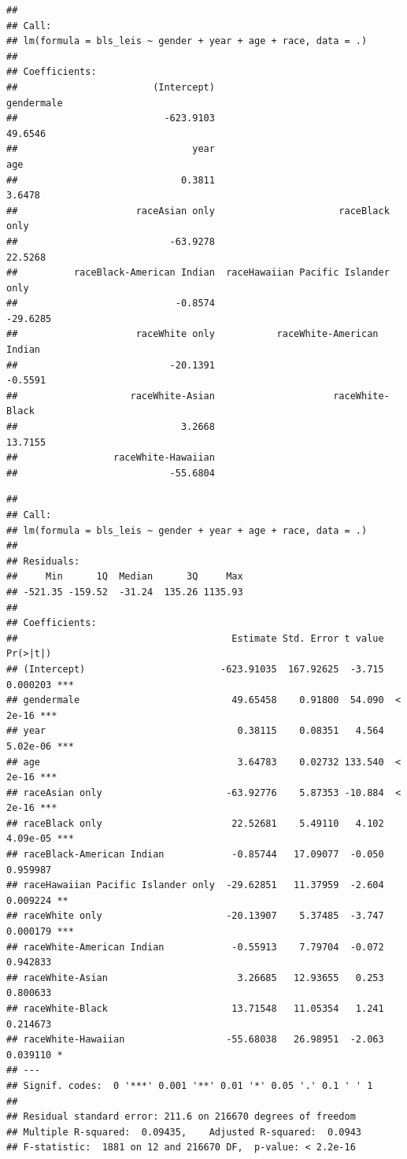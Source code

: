 \documentclass[
]{article}
\begin{document}
\begin{verbatim}
## 
## Call:
## lm(formula = bls_leis ~ gender + year + age + race, data = .)
## 
## Coefficients:
##                        (Intercept)                          gendermale  
##                          -623.9103                             49.6546  
##                               year                                 age  
##                             0.3811                              3.6478  
##                     raceAsian only                      raceBlack only  
##                           -63.9278                             22.5268  
##          raceBlack-American Indian  raceHawaiian Pacific Islander only  
##                            -0.8574                            -29.6285  
##                     raceWhite only           raceWhite-American Indian  
##                           -20.1391                             -0.5591  
##                    raceWhite-Asian                     raceWhite-Black  
##                             3.2668                             13.7155  
##                 raceWhite-Hawaiian  
##                           -55.6804
\end{verbatim}

\begin{verbatim}
## 
## Call:
## lm(formula = bls_leis ~ gender + year + age + race, data = .)
## 
## Residuals:
##     Min      1Q  Median      3Q     Max 
## -521.35 -159.52  -31.24  135.26 1135.93 
## 
## Coefficients:
##                                      Estimate Std. Error t value Pr(>|t|)    
## (Intercept)                        -623.91035  167.92625  -3.715 0.000203 ***
## gendermale                           49.65458    0.91800  54.090  < 2e-16 ***
## year                                  0.38115    0.08351   4.564 5.02e-06 ***
## age                                   3.64783    0.02732 133.540  < 2e-16 ***
## raceAsian only                      -63.92776    5.87353 -10.884  < 2e-16 ***
## raceBlack only                       22.52681    5.49110   4.102 4.09e-05 ***
## raceBlack-American Indian            -0.85744   17.09077  -0.050 0.959987    
## raceHawaiian Pacific Islander only  -29.62851   11.37959  -2.604 0.009224 ** 
## raceWhite only                      -20.13907    5.37485  -3.747 0.000179 ***
## raceWhite-American Indian            -0.55913    7.79704  -0.072 0.942833    
## raceWhite-Asian                       3.26685   12.93655   0.253 0.800633    
## raceWhite-Black                      13.71548   11.05354   1.241 0.214673    
## raceWhite-Hawaiian                  -55.68038   26.98951  -2.063 0.039110 *  
## ---
## Signif. codes:  0 '***' 0.001 '**' 0.01 '*' 0.05 '.' 0.1 ' ' 1
## 
## Residual standard error: 211.6 on 216670 degrees of freedom
## Multiple R-squared:  0.09435,    Adjusted R-squared:  0.0943 
## F-statistic:  1881 on 12 and 216670 DF,  p-value: < 2.2e-16
\end{verbatim}
\end{document}
